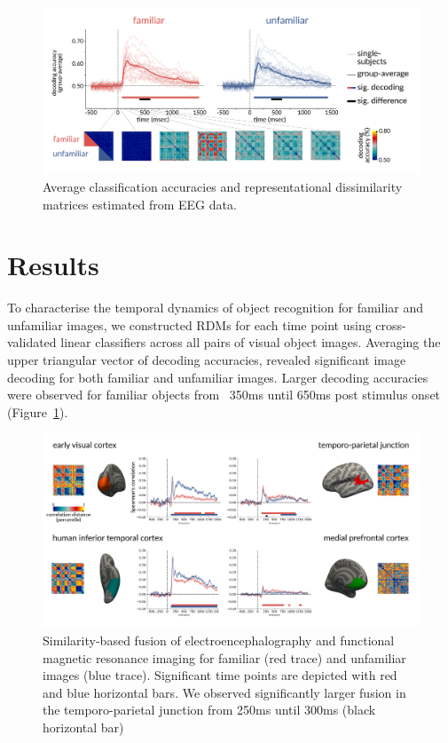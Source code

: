 \documentclass[10pt,letterpaper]{article}
\begin{document}
\begin{figure}[ht]
  \begin{center}
  \includegraphics[width=\linewidth]{figures/figure2.png}
  \end{center}
  \caption{
    Average classification accuracies and representational dissimilarity
    matrices estimated from EEG data.
  } 
  \label{fig2}
  \end{figure}

\section{Results}

To characterise the temporal dynamics of object recognition for familiar and
unfamiliar images, we constructed RDMs for each time point using cross-validated
linear classifiers across all pairs of visual object images. Averaging the upper
triangular vector of decoding accuracies, revealed significant image decoding
for both familiar and unfamiliar images. Larger decoding accuracies were
observed for familiar objects from ~350ms until 650ms post stimulus onset
(Figure~\ref{fig2}). 

\begin{figure}[t]
\begin{center}
\includegraphics[width=\linewidth]{figures/figure3.png}
\end{center}
\caption{
  Similarity-based fusion of electroencephalography and functional magnetic
  resonance imaging for familiar (red trace) and unfamiliar images (blue
  trace). Significant time points are depicted with red and blue horizontal
  bars. We observed significantly larger fusion in the temporo-parietal
  junction from 250ms until 300ms (black horizontal bar)
} 
\label{fig3}
\end{figure}
\end{document}
